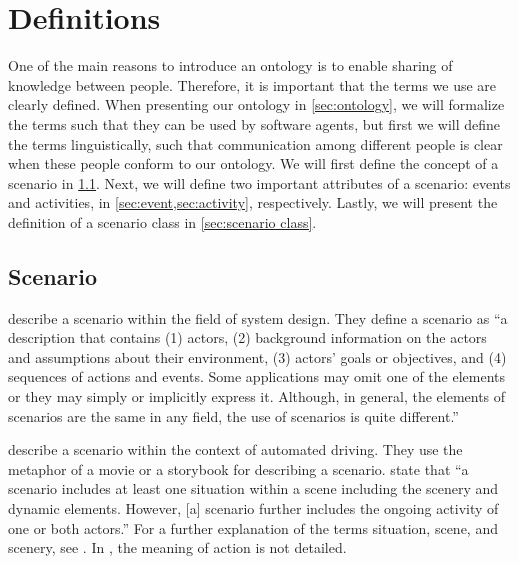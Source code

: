\section{Definitions}
\label{sec:definitions}

One of the main reasons to introduce an ontology is to enable sharing of knowledge between people. Therefore, it is important that the terms we use are clearly defined. When presenting our ontology in \cref{sec:ontology}, we will formalize the terms such that they can be used by software agents, but first we will define the terms linguistically, such that communication among different people is clear when these people conform to our ontology. We will first define the concept of a scenario in \cref{sec:scenario}. Next, we will define two important attributes of a scenario: events and activities, in \cref{sec:event,sec:activity}, respectively. Lastly, we will present the definition of a scenario class in \cref{sec:scenario class}.



\subsection{Scenario}
\label{sec:scenario}

\textcite{go2004blind} describe a scenario within the field of system design. They define a scenario as ``a description that contains (1) actors, (2) background information on the actors and assumptions about their environment, (3) actors' goals or objectives, and (4) sequences of actions and events. Some applications may omit one of the elements or they may simply or implicitly express it. Although, in general, the elements of scenarios are the same in any field, the use of scenarios is quite different.'' 

\textcite{geyer2014} describe a scenario within the context of automated driving. They use the metaphor of a movie or a storybook for describing a scenario. \textcite{geyer2014} state that ``a scenario includes at least one situation within a scene including the scenery and dynamic elements. However, [a] scenario further includes the ongoing activity of one or both actors.'' For a further explanation of the terms situation, scene, and scenery, see \cite{geyer2014}. 
In \cite{geyer2014}, the meaning of action is not detailed.

